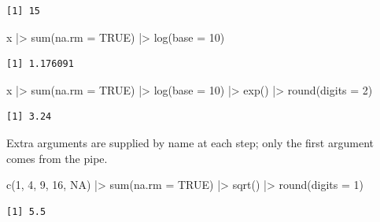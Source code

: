 \documentclass[
  letterpaper,
  DIV=11,
  numbers=noendperiod]{scrreprt}
\newenvironment{Shaded}{\begin{snugshade}}{\end{snugshade}}
\newcommand{\AttributeTok}[1]{\textcolor[rgb]{0.40,0.45,0.13}{#1}}
\newcommand{\ConstantTok}[1]{\textcolor[rgb]{0.56,0.35,0.01}{#1}}
\newcommand{\DecValTok}[1]{\textcolor[rgb]{0.68,0.00,0.00}{#1}}
\newcommand{\FunctionTok}[1]{\textcolor[rgb]{0.28,0.35,0.67}{#1}}
\newcommand{\NormalTok}[1]{\textcolor[rgb]{0.00,0.23,0.31}{#1}}
\newcommand{\SpecialCharTok}[1]{\textcolor[rgb]{0.37,0.37,0.37}{#1}}
\renewcommand{\[}{\begin{equation}}
\renewcommand{\]}{\end{equation}}
\begin{document}
\begin{verbatim}
[1] 15
\end{verbatim}

\begin{Shaded}
\begin{Highlighting}[]
\NormalTok{x }\SpecialCharTok{|\textgreater{}} \FunctionTok{sum}\NormalTok{(}\AttributeTok{na.rm =} \ConstantTok{TRUE}\NormalTok{) }\SpecialCharTok{|\textgreater{}} \FunctionTok{log}\NormalTok{(}\AttributeTok{base =} \DecValTok{10}\NormalTok{)}
\end{Highlighting}
\end{Shaded}

\begin{verbatim}
[1] 1.176091
\end{verbatim}

\begin{Shaded}
\begin{Highlighting}[]
\NormalTok{x }\SpecialCharTok{|\textgreater{}} \FunctionTok{sum}\NormalTok{(}\AttributeTok{na.rm =} \ConstantTok{TRUE}\NormalTok{) }\SpecialCharTok{|\textgreater{}} \FunctionTok{log}\NormalTok{(}\AttributeTok{base =} \DecValTok{10}\NormalTok{) }\SpecialCharTok{|\textgreater{}} \FunctionTok{exp}\NormalTok{() }\SpecialCharTok{|\textgreater{}} \FunctionTok{round}\NormalTok{(}\AttributeTok{digits =} \DecValTok{2}\NormalTok{)}
\end{Highlighting}
\end{Shaded}

\begin{verbatim}
[1] 3.24
\end{verbatim}

Extra arguments are supplied by name at each step; only the first
argument comes from the pipe.

\begin{Shaded}
\begin{Highlighting}[]
\FunctionTok{c}\NormalTok{(}\DecValTok{1}\NormalTok{, }\DecValTok{4}\NormalTok{, }\DecValTok{9}\NormalTok{, }\DecValTok{16}\NormalTok{, }\ConstantTok{NA}\NormalTok{) }\SpecialCharTok{|\textgreater{}}
  \FunctionTok{sum}\NormalTok{(}\AttributeTok{na.rm =} \ConstantTok{TRUE}\NormalTok{) }\SpecialCharTok{|\textgreater{}}
  \FunctionTok{sqrt}\NormalTok{() }\SpecialCharTok{|\textgreater{}}
  \FunctionTok{round}\NormalTok{(}\AttributeTok{digits =} \DecValTok{1}\NormalTok{)}
\end{Highlighting}
\end{Shaded}

\begin{verbatim}
[1] 5.5
\end{verbatim}
\end{document}
